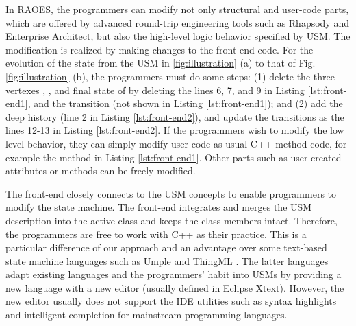 

In RAOES, the programmers can modify not only structural and user-code parts, which are offered by advanced round-trip engineering tools such as Rhapsody and Enterprise Architect, but also the high-level logic behavior specified by USM.
The modification is realized by making changes to the front-end code.
For the evolution of the state  from the USM in \ref{fig:illustration} (a) to that of Fig. \ref{fig:illustration} (b), the programmers must do some steps: (1) delete the three vertexes , , and final state of  by deleting the lines 6, 7, and 9 in Listing \ref{lst:front-end1}, and the transition  (not shown in Listing \ref{lst:front-end1}); and 
(2) add the deep history  (line 2 in Listing \ref{lst:front-end2}), and update the transitions as the lines 12-13 in Listing \ref{lst:front-end2}.
If the programmers wish to modify the low level behavior, they can simply modify user-code as usual C++ method code, for example the method  in Listing \ref{lst:front-end1}.
Other parts such as user-created attributes or methods can be freely modified.









The front-end closely connects to the USM concepts to enable programmers to modify the state machine.
The front-end integrates and merges the USM description into the active class  and keeps the class members intact. 
Therefore, the programmers are free to work with C++ as their practice.
This is a particular difference of our approach and an advantage over some text-based state machine languages such as Umple \cite{lethbridge2010umplification} and ThingML \cite{thingml}.
The latter languages adapt existing languages and the programmers' habit into USMs by providing a new language with a new editor (usually defined in Eclipse Xtext).
However, the new editor usually does not support the IDE utilities such as syntax highlights and intelligent completion for mainstream programming languages. 



